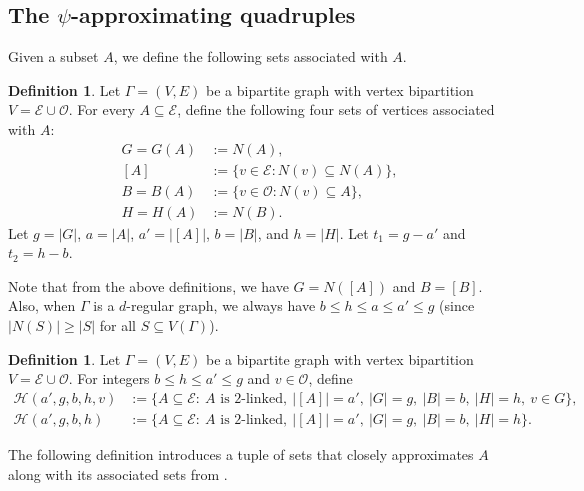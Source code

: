 \documentclass{amsart}
\theoremstyle{definition}
\newtheorem{mydef}[thm]{Definition}
\newcommand{\cO}{\mathcal{O} }
\newcommand{\cE}{\mathcal{E} }
\newcommand{\0}[0]{\emptyset}
\begin{document}
\subsection{The $\psi$-approximating quadruples}\label{sec:covering-approx}


Given a subset $A$, we define the following sets associated with $A$.


\begin{mydef}\label{def:agbh}
Let $\Gamma=(V, E)$ be a bipartite graph with vertex bipartition $V=\cE\cup\cO$.
For every $A\subseteq \cE$, define the following four sets of vertices associated with $A$:
\begin{align*}
    G=G(A)&:=N(A),\\
    [A]&:=\{v\in\cE:N(v)\subseteq N(A)\},\\
    B=B(A)&:=\{v\in \cO:N(v)\subseteq A\},\\
    H=H(A)&:=N(B).
\end{align*}
Let $g=|G|$, $a=|A|$, $a'=|[A]|$, $b=|B|$, and $h=|H|$. Let $t_1=g-a'$ and $t_2=h-b$.
\end{mydef}

Note that from the above definitions, we have $G=N([A])$ and $B=[B]$. Also, when $\Gamma$ is a $d$-regular graph, we always have $b\leq h\leq a\leq a'\leq g$ (since $|N(S)|\geq|S|$ for all $S\subseteq V(\Gamma)$). 

\begin{mydef}\label{def:families}
Let $\Gamma=(V, E)$ be a bipartite graph with vertex bipartition $V=\cE\cup\cO$. For integers $b\le h\le a'\le g$ and $v\in \cO$, define
\begin{align*}
\mathcal H(a',g,b,h,v)
&:=
\bigl\{
A\subseteq \cE:\ 
A\text{ is $2$-linked},\ |[A]|=a',\ |G|=g,\ |B|=b,\ |H|=h,\ v\in G
\bigr\},\\
\mathcal H(a',g,b,h)
&:=
\bigl\{
A\subseteq \cE:\ 
A\text{ is $2$-linked},\ |[A]|=a',\ |G|=g,\ |B|=b,\ |H|=h
\bigr\}.
\end{align*}
\end{mydef}

The following definition introduces a tuple of sets that closely approximates $A$ along with its associated sets from .
\end{document}
